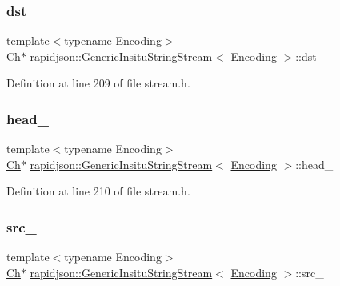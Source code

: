 \subsubsection{\texorpdfstring{dst\_}{dst\_}}
{\footnotesize\ttfamily template$<$typename Encoding$>$ \\
\mbox{\hyperlink{structrapidjson_1_1_generic_insitu_string_stream_a3a7ed47ee193d1e5f850aa841b743631}{Ch}}$\ast$ \mbox{\hyperlink{structrapidjson_1_1_generic_insitu_string_stream}{rapidjson\+::\+Generic\+Insitu\+String\+Stream}}$<$ \mbox{\hyperlink{classrapidjson_1_1_encoding}{Encoding}} $>$\+::dst\+\_\+}



Definition at line 209 of file stream.\+h.

\mbox{\label{structrapidjson_1_1_generic_insitu_string_stream_a6d611d9f5372d457373b90a711dd2717}} 
\subsubsection{\texorpdfstring{head\_}{head\_}}
{\footnotesize\ttfamily template$<$typename Encoding$>$ \\
\mbox{\hyperlink{structrapidjson_1_1_generic_insitu_string_stream_a3a7ed47ee193d1e5f850aa841b743631}{Ch}}$\ast$ \mbox{\hyperlink{structrapidjson_1_1_generic_insitu_string_stream}{rapidjson\+::\+Generic\+Insitu\+String\+Stream}}$<$ \mbox{\hyperlink{classrapidjson_1_1_encoding}{Encoding}} $>$\+::head\+\_\+}



Definition at line 210 of file stream.\+h.

\mbox{\label{structrapidjson_1_1_generic_insitu_string_stream_ae68a80f99fd484704af045a0ccd9c00f}} 
\subsubsection{\texorpdfstring{src\_}{src\_}}
{\footnotesize\ttfamily template$<$typename Encoding$>$ \\
\mbox{\hyperlink{structrapidjson_1_1_generic_insitu_string_stream_a3a7ed47ee193d1e5f850aa841b743631}{Ch}}$\ast$ \mbox{\hyperlink{structrapidjson_1_1_generic_insitu_string_stream}{rapidjson\+::\+Generic\+Insitu\+String\+Stream}}$<$ \mbox{\hyperlink{classrapidjson_1_1_encoding}{Encoding}} $>$\+::src\+\_\+}



